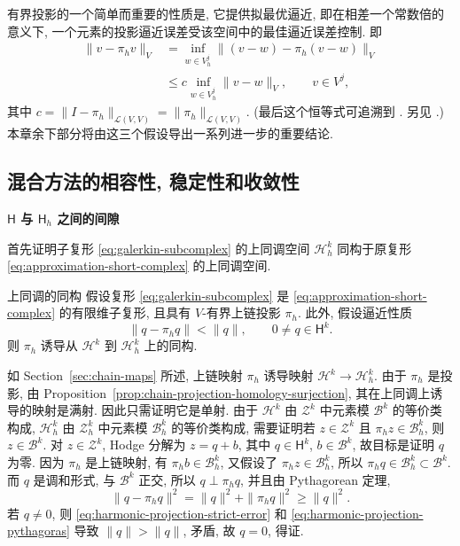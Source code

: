 有界投影的一个简单而重要的性质是, 它提供拟最优逼近, 即在相差一个常数倍的意义下, 一个元素的投影逼近误差受该空间中的最佳逼近误差控制. 即
\begin{equation}\label{eq:projection-quasioptimality}
\begin{aligned}
\|v-\pi_hv\|_V&=\inf_{w\in V_h^j}\|(v-w)-\pi_h(v-w)\|_V\\
&\leq c\inf_{w\in V_h^j}\|v-w\|_V,\qquad v\in V^j,
\end{aligned}
\end{equation}
其中 $c=\|I-\pi_h\|_{\mathcal L(V,V)}=\|\pi_h\|_{\mathcal L(V,V)}$. (最后这个恒等式可追溯到 . 另见 .) 本章余下部分将由这三个假设导出一系列进一步的重要结论.

\subsection{混合方法的相容性, 稳定性和收敛性}\label{subsec:mixed-consistency-stability}

\medskip\noindent\textbf{{$\mathsf H$ 与 $\mathsf H_h$ 之间的间隙}}\par
首先证明子复形 \eqref{eq:galerkin-subcomplex} 的上同调空间 $\mathcal H_h^k$ 同构于原复形 \eqref{eq:approximation-short-complex} 的上同调空间.

\begin{Theorem}{{上同调的同构}}\label{thm:discrete-cohomology-isomorphism}
假设复形 \eqref{eq:galerkin-subcomplex} 是 \eqref{eq:approximation-short-complex} 的有限维子复形, 且具有 $V$-有界上链投影 $\pi_h$. 此外, 假设逼近性质
\begin{equation}\label{eq:harmonic-projection-strict-error}
\|q-\pi_hq\|<\|q\|,\qquad0\ne q\in\mathsf H^k.
\end{equation}
则 $\pi_h$ 诱导从 $\mathcal H^k$ 到 $\mathcal H_h^k$ 上的同构.
\end{Theorem}

\begin{Proof}
如 Section~\ref{sec:chain-maps} 所述, 上链映射 $\pi_h$ 诱导映射 $\mathcal H^k\to\mathcal H_h^k$. 由于 $\pi_h$ 是投影, 由 Proposition~\ref{prop:chain-projection-homology-surjection}, 其在上同调上诱导的映射是满射. 因此只需证明它是单射. 由于 $\mathcal H^k$ 由 $\mathcal Z^k$ 中元素模 $\mathcal B^k$ 的等价类构成, $\mathcal H_h^k$ 由 $\mathcal Z_h^k$ 中元素模 $\mathcal B_h^k$ 的等价类构成, 需要证明若 $z\in\mathcal Z^k$ 且 $\pi_hz\in\mathcal B_h^k$, 则 $z\in\mathcal B^k$. 对 $z\in\mathcal Z^k$, Hodge 分解为 $z=q+b$, 其中 $q\in\mathsf H^k$, $b\in\mathcal B^k$, 故目标是证明 $q$ 为零. 因为 $\pi_h$ 是上链映射, 有 $\pi_hb\in\mathcal B_h^k$, 又假设了 $\pi_hz\in\mathcal B_h^k$, 所以 $\pi_hq\in\mathcal B_h^k\subset\mathcal B^k$. 而 $q$ 是调和形式, 与 $\mathcal B^k$ 正交, 所以 $q\perp\pi_hq$, 并且由 Pythagorean 定理,
\begin{equation}\label{eq:harmonic-projection-pythagoras}
\|q-\pi_hq\|^2=\|q\|^2+\|\pi_hq\|^2\geq\|q\|^2.
\end{equation}
若 $q\ne0$, 则 \eqref{eq:harmonic-projection-strict-error} 和 \eqref{eq:harmonic-projection-pythagoras} 导致 $\|q\|>\|q\|$, 矛盾, 故 $q=0$, 得证.
\end{Proof}

